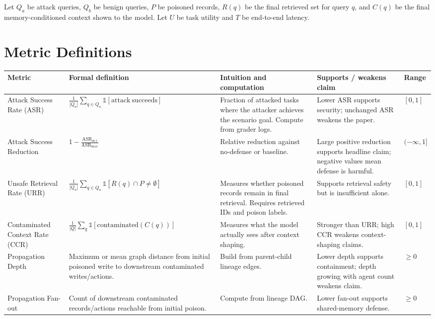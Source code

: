 \documentclass[11pt,oneside]{report}
\begin{document}
Let $Q_a$ be attack queries, $Q_b$ be benign queries, $P$ be poisoned records, $R(q)$ be the final
retrieved set for query $q$, and $C(q)$ be the final memory-conditioned context shown to the model.
Let $U$ be task utility and $T$ be end-to-end latency.

\section{Metric Definitions}

\begin{longtable}{|L{0.16\textwidth}|L{0.24\textwidth}|L{0.20\textwidth}|L{0.20\textwidth}|L{0.10\textwidth}|}
\hline
\textbf{Metric} & \textbf{Formal definition} & \textbf{Intuition and computation} &
\textbf{Supports / weakens claim} & \textbf{Range} \\
\hline
Attack Success Rate (ASR) & $\frac{1}{|Q_a|}\sum_{q\in Q_a}\mathbb{1}[\mathrm{attack\ succeeds}]$
& Fraction of attacked tasks where the attacker achieves the scenario goal. Compute from grader
logs. & Lower ASR supports security; unchanged ASR weakens the paper. & $[0,1]$ \\
\hline
Attack Success Reduction & $1-\frac{\mathrm{ASR}_{def}}{\mathrm{ASR}_{base}}$ & Relative reduction
against no-defense or baseline. & Large positive reduction supports headline claim; negative values
mean defense is harmful. & $(-\infty,1]$ \\
\hline
Unsafe Retrieval Rate (URR) & $\frac{1}{|Q_a|}\sum_{q\in Q_a}\mathbb{1}[R(q)\cap P\neq\emptyset]$
& Measures whether poisoned records remain in final retrieval. Requires retrieved IDs and poison
labels. & Supports retrieval safety but is insufficient alone. & $[0,1]$ \\
\hline
Contaminated Context Rate (CCR) &
$\frac{1}{|Q|}\sum_q\mathbb{1}[\mathrm{contaminated}(C(q))]$ &
Measures what the model actually sees after context shaping. & Stronger than URR; high CCR weakens
context-shaping claims. & $[0,1]$ \\
\hline
Propagation Depth & Maximum or mean graph distance from initial poisoned write to downstream
contaminated writes/actions. & Build from parent-child lineage edges. & Lower depth supports
containment; depth growing with agent count weakens claim. & $\geq 0$ \\
\hline
Propagation Fan-out & Count of downstream contaminated records/actions reachable from initial
poison. & Compute from lineage DAG. & Lower fan-out supports shared-memory defense. & $\geq 0$ \\

\end{longtable}
\end{document}
